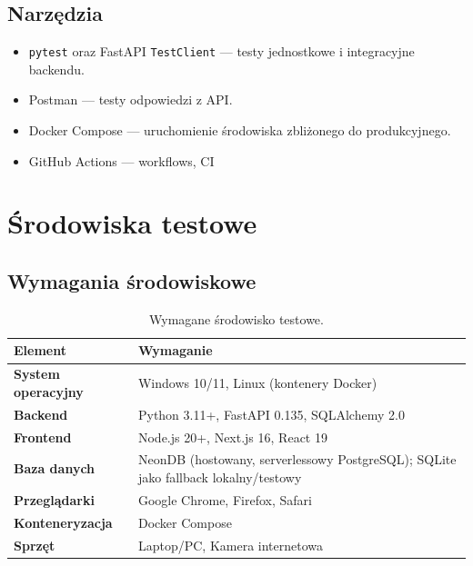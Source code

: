 \documentclass[11pt,a4paper]{article}
\begin{document}
\subsection{Narzędzia}
\begin{itemize}
  \item \texttt{pytest} oraz FastAPI \texttt{TestClient} — testy jednostkowe i integracyjne backendu.
  \item Postman — testy odpowiedzi z API.
  \item Docker Compose — uruchomienie środowiska zbliżonego do produkcyjnego.
  \item GitHub Actions — workflows, CI
\end{itemize}

\section{Środowiska testowe}

\subsection{Wymagania środowiskowe}
\begin{table}[h]
\centering
\begin{tabularx}{\textwidth}{>{\bfseries}p{3.5cm} Y}
\toprule
\textbf{Element} & \textbf{Wymaganie} \\
\midrule
System operacyjny & Windows 10/11, Linux (kontenery Docker) \\
Backend & Python 3.11+, FastAPI 0.135, SQLAlchemy 2.0 \\
Frontend & Node.js 20+, Next.js 16, React 19 \\
Baza danych & NeonDB (hostowany, serverlessowy PostgreSQL); SQLite jako fallback lokalny/testowy \\
Przeglądarki & Google Chrome, Firefox, Safari \\
Konteneryzacja & Docker Compose \\
Sprzęt & Laptop/PC, Kamera internetowa\\
\bottomrule
\end{tabularx}
\caption{Wymagane środowisko testowe.}
\end{table}
\end{document}
